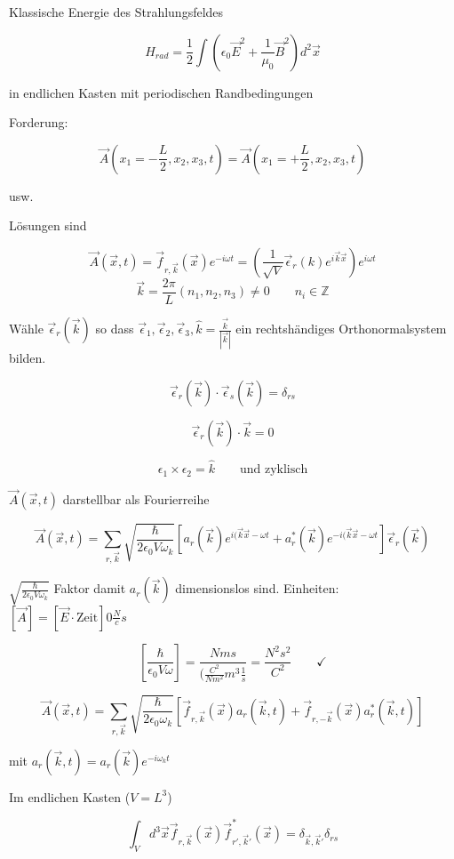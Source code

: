 Klassische Energie des Strahlungsfeldes

\[H_{rad} = \frac{1}{2}\int (\epsilon_0\vec E ^2 + \frac{1}{\mu_0}\vec B^2)d^2\vec x\]

in endlichen Kasten mit periodischen Randbedingungen

Forderung:

\[\vec A(x_1 = -\frac{L}{2},x_2,x_3,t) = \vec A(x_1 =+\frac{L}{2},x_2,x_3,t) \]

usw.

Lösungen sind

\[\vec A(\vec x,t) = \vec f_{r,\vec k}(\vec x)e^{-i\omega t} = (\frac{1}{\sqrt{V}}\vec \epsilon_r(k) e^{i\vec k\vec x} )e^{i\omega t} \]
\[\vec k = \frac{2\pi}{L}(n_1,n_2,n_3)\neq 0\qquad n_i\in \mathbb Z\]


Wähle \(\vec \epsilon_r(\vec k)\) so dass \(\vec \epsilon_1, \vec \epsilon_2,\vec \epsilon_3,\hat k = \frac{\vec k}{|\vec k|}\) ein rechtshändiges Orthonormalsystem bilden.

\[\vec \epsilon_r(\vec k)\cdot \vec \epsilon_s(\vec k) = \delta_{rs}\]

\[ \vec \epsilon_r(\vec k)\cdot \vec k = 0 \]

\[  \epsilon_1  \times \epsilon_2 = \hat k \qquad \text{und zyklisch}\]

\(\vec A(\vec x,t)\) darstellbar als Fourierreihe

\[\vec A(\vec x,t) = \sum_{r,\vec k}\sqrt{ \frac{\hbar}{2\epsilon_0 V\omega_k}}\left[ a_r(\vec k) e^{i(\vec k\vec x-\omega t} + a_r^*(\vec k) e^{-i(\vec k\vec x-\omega t}   \right]\vec \epsilon_r(\vec k)  \]

\(\sqrt{ \frac{\hbar}{2\epsilon_0 V\omega_k}}\) Faktor damit \(a_r(\vec k)\) dimensionslos sind. Einheiten: \([\vec A] = [\vec E\cdot\text{Zeit}] 0 \frac{N}{c}s\)

\[[\frac{\hbar}{\epsilon_0 V\omega}] = \frac{Nms}{(\frac{C^2}{Nm^2}m^3 \frac{1}{s}} = \frac{N^2s^2}{C^2}\qquad \checkmark\]


\[\vec A(\vec x,t ) = \sum_{r,\vec k} \sqrt{ \frac{\hbar}{2\epsilon_0 \omega_k}} \left[\vec f_{r,\vec k}(\vec x) a_r(\vec k,t)  + \vec f_{r,-\vec k}(\vec x)  a_r^*(\vec k,t)   \right] \]

mit \( a_r(\vec k,t) = a_r(\vec k)e^{-i\omega_k t}  \)

Im endlichen Kasten (\(V=L^3\))

\[\int_V d^3\vec x \vec f_{r,\vec k}(\vec x) \vec f^*_{r',\vec k'}(\vec x) = \delta_{\vec k,\vec k'}\delta_{rs}\]


